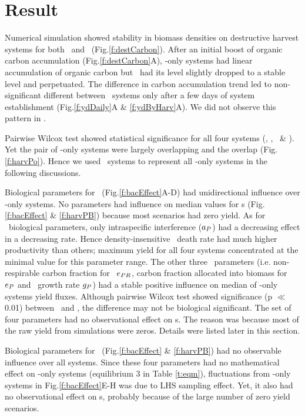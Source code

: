 \documentclass[../thesis.tex]{subfiles} %
\begin{document}
\section{Result}
Numerical simulation showed stability in biomass densities on destructive harvest systems for both \PoN\ and \PBN\ (Fig.\ref{f:destCarbon}).  After an initial boost of organic carbon accumulation (Fig.\ref{f:destCarbon}A), \phy-only systems had linear accumulation of organic carbon but \pbs\ had its level slightly dropped to a stable level and perpetuated.  The difference in carbon accumulation trend led to non-significant different between \PoN\ systems only after a few days of system establishment (Fig.\ref{f:ydDaily}A \& \ref{f:ydByHarv}A).  We did not observe this pattern in \pbs.

Pairwise Wilcox test showed statistical significance for all four systems (\PBH, \PoH, \PBN\ \& \PoN).  Yet the pair of \phy-only systems were largely overlapping and the overlap (Fig.\ref{f:harvPo}).  Hence we used \PoN\ systems to represent all \phy-only systems in the following discussions.

Biological parameters for \phy\ (Fig.\ref{f:bacEffect}A-D) had unidirectional influence over \phy-only systems.  No parameters had influence on median values for \pbs s (Fig.\ref{f:bacEffect} \& \ref{f:harvPB}) because most scenarios had zero yield.   As for \phy\ biological parameters, only intraspecific interference ($a_P$) had a decreasing effect in a decreasing rate.  Hence density-insensitive \phy\ death rate had much higher productivity than others; maximum yield for all four systems concentrated at the minimal value for this parameter range.  The other three \phy\ parameters (i.e. non-respirable carbon fraction for \phy\ $e_{PR}$, carbon fraction allocated into biomass for \phy\ $e_P$ and \phy\ growth rate $g_P$) had a stable positive influence on median of \phy-only systems yield fluxes.  Although pairwise Wilcox test showed significance (p $\ll$ 0.01) between \PoH\ and \PoN, the difference may not be biological significant.  The set of four parameters had no observational effect on \pbs s.  The reason was because most of the raw yield from simulations were zeros.  Details were listed later in this section.

Biological parameters for \bac\ (Fig.\ref{f:bacEffect} \& \ref{f:harvPB}) had no observable influence over all systems.  Since these four parameters had no mathematical effect on \phy-only systems (equilibrium 3 in Table \ref{t:eqm}), fluctuations from \phy-only systems in Fig.\ref{f:bacEffect}E-H was due to LHS sampling effect.  Yet, it also had no observational effect on \pbs s, probably because of the large number of zero yield scenarios.
\end{document}
